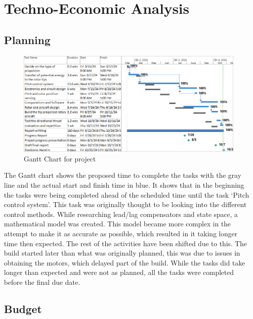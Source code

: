\chapter{Techno-Economic Analysis}
\label{sec: techo-analysis}
        \section{Planning}
        \begin{figure} [H]
        \includegraphics[width = \linewidth]{figs/Gantt Charts/Final_Rerport_Gantt.png}
        \caption{Gantt Chart for project}
        \label{fig: gantt_chart}
        \end{figure}
        The Gantt chart shows the proposed time to complete the tasks with the gray line and the actual start and finish time in blue. It shows that in the beginning the tasks were being completed ahead of the scheduled time until the task `Pitch control system'. This task was originally thought to be looking into the different control methods. While researching lead/lag compensators and state space, a mathematical model was created. This model became more complex in the attempt to make it as accurate as possible, which resulted in it taking longer time then expected. The rest of the activities have been shifted due to this. The build started later than what was originally planned, this was due to issues in obtaining the motors, which delayed part of the build. While the tasks did take longer than expected and were not as planned, all the tasks were completed before the final due date.
\pagebreak
        \section{Budget}

